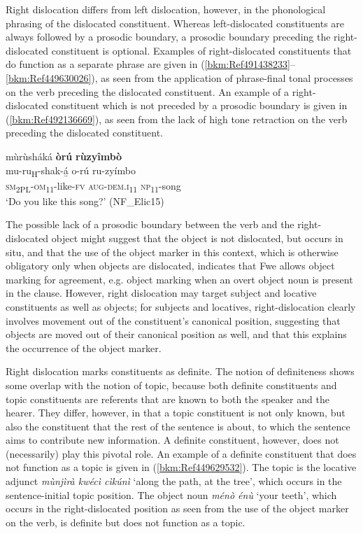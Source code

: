 Right dislocation differs from left dislocation, however, in the phonological phrasing of the dislocated constituent. Whereas left-dislocated constituents are always followed by a prosodic boundary, a prosodic boundary preceding the right-dislocated constituent is optional. Examples of right-dislocated constituents that do function as a separate phrase are given in (\ref{bkm:Ref491438233}--\ref{bkm:Ref449630026}), as seen from the application of phrase-final tonal processes on the verb preceding the dislocated constituent. An example of a right-dislocated constituent which is not preceded by a prosodic boundary is given in (\ref{bkm:Ref492136669}), as seen from the lack of high tone retraction on the verb preceding the dislocated constituent.

\ea
\label{bkm:Ref492136669}
mùrùsháká \textbf{òrú} \textbf{rùzyîmbò}\\
\gll mu-ru\textsubscript{H}-shak-á̲  o-rú    ru-zyímbo\\
\textsc{sm}\textsubscript{2PL}-\textsc{om}\textsubscript{11}-like-\textsc{fv}  \textsc{aug}-\textsc{dem}.\textsc{i}\textsubscript{11}  \textsc{np}\textsubscript{11}-song\\
\glt ‘Do you like this song?’ (NF\_Elic15)
\z

The possible lack of a prosodic boundary between the verb and the right-dislocated object might suggest that the object is not dislocated, but occurs in situ, and that the use of the object marker in this context, which is otherwise obligatory only when objects are dislocated, indicates that Fwe allows object marking for agreement, e.g. object marking when an overt object noun is present in the clause. However, right dislocation may target subject and locative constituents as well as objects; for subjects and locatives, right-dislocation clearly involves movement out of the constituent’s canonical position, suggesting that objects are moved out of their canonical position as well, and that this explains the occurrence of the object marker.

Right dislocation marks constituents as definite. The notion of definiteness shows some overlap with the notion of topic, because both definite constituents and topic constituents are referents that are known to both the speaker and the hearer. They differ, however, in that a topic constituent is not only known, but also the constituent that the rest of the sentence is about, to which the sentence aims to contribute new information. A definite constituent, however, does not (necessarily) play this pivotal role. An example of a definite constituent that does not function as a topic is given in (\ref{bkm:Ref449629532}). The topic is the locative adjunct \textit{mùnjìrà kwécì cìkúnì} ‘along the path, at the tree’, which occurs in the sentence-initial topic position. The object noun \textit{ménò énù} ‘your teeth’, which occurs in the right-dislocated position as seen from the use of the object marker on the verb, is definite but does not function as a topic.

